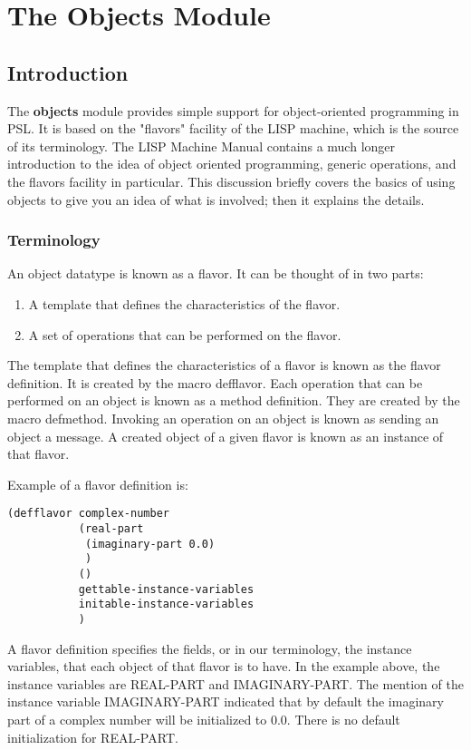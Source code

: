 \chapter{The Objects Module}

\section{Introduction}

The {\bf objects} module provides simple support for object-oriented
programming in PSL. It is based on the "flavors" facility of
the LISP machine, which is the source of its terminology. The
LISP  Machine  Manual contains a much longer introduction to the
idea of object oriented programming, generic operations, and the
flavors facility in particular.  This discussion briefly  covers
the  basics  of  using  objects  to  give you an idea of what is
involved; then it explains the details.

\subsection{Terminology}

  An object datatype is known as a flavor.  It can be thought of
in two parts:


\begin{enumerate}
\item  A template that defines the characteristics of the flavor.
\item  A set of operations that can be performed on the flavor.
\end{enumerate}
The template that defines the characteristics  of  a  flavor  is
known  as  the  flavor  definition.   It is created by the macro
defflavor.  Each operation that can be performed on an object is
known as a method definition.  They are  created  by  the  macro
defmethod.   Invoking  an  operation  on  an  object is known as
sending an object a message.  A created object of a given flavor
is known as an instance of that flavor.

  Example of a flavor definition is:

\begin{verbatim}
(defflavor complex-number
           (real-part
            (imaginary-part 0.0)
            )
           ()
           gettable-instance-variables
           initable-instance-variables
           )
\end{verbatim}

A flavor definition specifies the fields, or in our terminology,
the  instance variables, that each object of that flavor  is  to
have.    In  the  example  above,  the  instance  variables  are
REAL-PART and  IMAGINARY-PART.   The  mention  of  the  instance
variable  IMAGINARY-PART indicated that by default the imaginary
part of a complex number will be initialized to 0.0. There is no
default initialization for REAL-PART.

